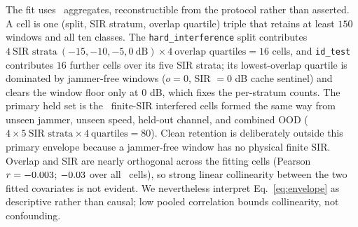\documentclass[letterpaper,journal]{IEEEtran}
\begin{document}
The fit uses \EnvelopeFitCells\ aggregates, reconstructible from the protocol
rather than asserted. A cell is one (split, SIR stratum,
overlap quartile) triple that retains at least $150$ windows and all ten
classes. The \texttt{hard\_interference} split contributes
$4\ \text{SIR strata}\ (-15,-10,-5,0\ \text{dB})\times4\ \text{overlap
quartiles}=16$ cells, and \texttt{id\_test} contributes $16$ further cells
over its five SIR strata; its lowest-overlap quartile is dominated by
jammer-free windows ($o=0$, SIR $=0$ dB cache sentinel) and clears the window
floor only at $0$ dB, which fixes the per-stratum counts. The primary held set is the
\EnvelopeHoldoutCells\ finite-SIR interfered cells formed the same way from
unseen jammer, unseen speed, held-out channel, and combined OOD
($4\times5\ \text{SIR strata}\times4\ \text{quartiles}=80$). Clean retention is
deliberately outside this primary envelope because a jammer-free window has no
physical finite SIR.
Overlap and SIR are nearly orthogonal across the fitting cells
(Pearson $r=-0.003$; $-0.03$ over all
\EnvelopeCellCount\ cells), so strong linear collinearity between the two
fitted covariates is not evident. We nevertheless interpret
Eq.~\eqref{eq:envelope} as descriptive rather than causal; low pooled
correlation bounds collinearity, not confounding.
\end{document}
